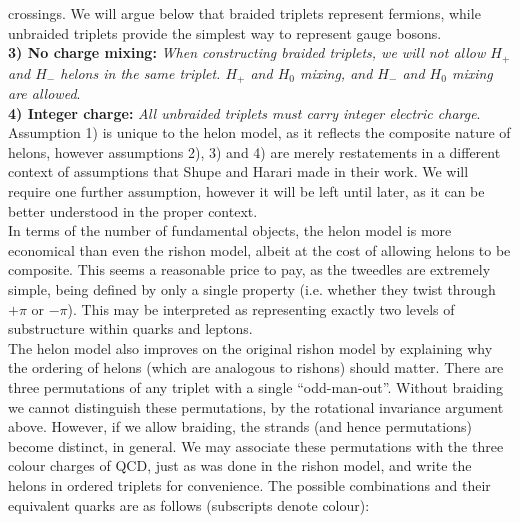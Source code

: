 \documentclass[twocolumn,showpacs,preprintnumbers,amsmath,amssymb]{revtex4}
\begin{document}
crossings. 
We will argue below that 
braided triplets represent fermions, while unbraided 
triplets provide the simplest way to represent gauge bosons.\\   
{\bf 3) No charge mixing:} {\em When constructing braided triplets, we will not 
allow $H_+$ and $H_-$ helons in the same triplet. $H_+$ and $H_0$ mixing, and 
$H_-$ and $H_0$ mixing are allowed}.\\
{\bf 4) Integer charge:} {\em All unbraided triplets must carry integer electric 
charge}.\\
Assumption 1) is unique to the helon model, as it reflects the composite nature
of helons, however assumptions 2), 3) and 4) are merely restatements in a different
context of assumptions that Shupe and Harari made in their work. We will require 
one further assumption, however it will be left until later, as it can be better 
understood in the proper context.\\
In terms of the number of fundamental objects, the helon model is more economical 
than even the rishon model, albeit at the cost of allowing helons to be composite. 
This seems a reasonable price to pay, as the tweedles are extremely simple, being 
defined by only a single property (i.e. whether they twist through $+\pi$ or 
$-\pi$). This may be interpreted as representing exactly two levels of substructure
within quarks and leptons.\\ 
The helon model also improves on the original rishon model by explaining why the 
ordering of helons (which are analogous to rishons) should matter. There are three 
permutations of any triplet with a single ``odd-man-out''. Without braiding we 
cannot distinguish these permutations, by the rotational invariance argument above.
However, if we allow braiding, the strands (and hence permutations) become distinct, 
in general. We may associate these permutations with the three colour charges of QCD, 
just as was done in the rishon model, and write the helons in ordered triplets for 
convenience. The possible combinations and their equivalent quarks are as follows
(subscripts denote colour):
\end{document}
